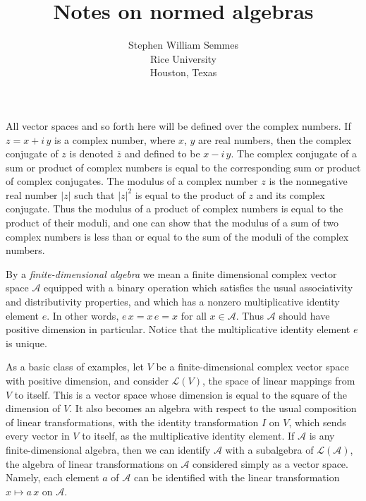 \documentclass[12pt,leqno,draft]{article}
\begin{document}
\title{Notes on normed algebras}



\author{Stephen William Semmes	\\
	Rice University		\\
	Houston, Texas}

\date{}


\maketitle



	All vector spaces and so forth here will be defined over the
complex numbers.  If $z = x + i \, y$ is a complex number, where $x$,
$y$ are real numbers, then the complex conjugate of $z$ is denoted
$\overline{z}$ and defined to be $x - i \, y$.  The complex conjugate
of a sum or product of complex numbers is equal to the corresponding
sum or product of complex conjugates.  The modulus of a complex number
$z$ is the nonnegative real number $|z|$ such that $|z|^2$ is equal to
the product of $z$ and its complex conjugate.  Thus the modulus of a
product of complex numbers is equal to the product of their moduli,
and one can show that the modulus of a sum of two complex numbers is
less than or equal to the sum of the moduli of the complex numbers.

	By a \emph{finite-dimensional algebra} we mean a finite
dimensional complex vector space $\mathcal{A}$ equipped with a binary
operation which satisfies the usual associativity and distributivity
properties, and which has a nonzero multiplicative identity element
$e$.  In other words, $e \, x = x \, e = x$ for all $x \in
\mathcal{A}$.  Thus $\mathcal{A}$ should have positive dimension in
particular.  Notice that the multiplicative identity element $e$ is
unique.

	As a basic class of examples, let $V$ be a finite-dimensional
complex vector space with positive dimension, and consider
$\mathcal{L}(V)$, the space of linear mappings from $V$ to itself.
This is a vector space whose dimension is equal to the square of the
dimension of $V$.  It also becomes an algebra with respect to the
usual composition of linear transformations, with the identity
transformation $I$ on $V$, which sends every vector in $V$ to itself,
as the multiplicative identity element.  If $\mathcal{A}$ is any
finite-dimensional algebra, then we can identify $\mathcal{A}$ with a
subalgebra of $\mathcal{L}(\mathcal{A})$, the algebra of linear
transformations on $\mathcal{A}$ considered simply as a vector space.
Namely, each element $a$ of $\mathcal{A}$ can be identified with the
linear transformation $x \mapsto a \, x$ on $\mathcal{A}$.
\end{document}
